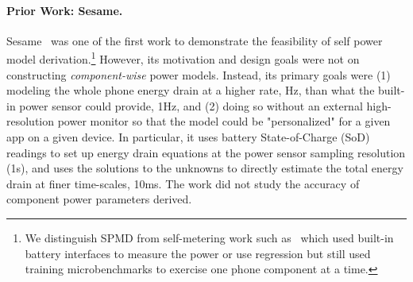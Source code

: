 \paragraph{Prior Work: Sesame.}
\label{sec:back}
%
Sesame~\cite{dong2011self} was one of the first work to demonstrate 
the feasibility of self power model derivation.\footnote{We distinguish SPMD from self-metering work such as~\cite{zhang2010accurate,devscope:2012} 
which used built-in battery interfaces to measure the power or 
use regression but still used training microbenchmarks to 
exercise one phone component at a time.
}
However, its motivation and design goals were not on constructing
{\it component-wise} power models. Instead, its primary goals were (1)
modeling the whole phone energy drain at a higher rate,  Hz,
than what the built-in power sensor could provide, \eg 1Hz, and (2)
doing so without an external high-resolution power monitor so that the model
could be "personalized" for a given app on a given device.
%
In particular, it uses battery State-of-Charge (SoD) readings to 
set up energy drain equations at the power sensor sampling 
resolution (\eg 1s), and uses the solutions to the unknowns to 
directly estimate the total energy drain at finer time-scales, \eg 10ms.
The work did not study the accuracy of component power parameters derived.

